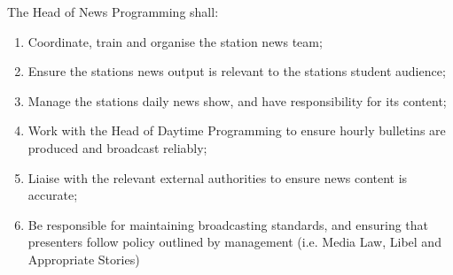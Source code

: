 \item The Head of News Programming shall:
\begin{enumerate}[label*=\arabic*.]
    \item Coordinate, train and organise the station news team;
    \item Ensure the stations news output is relevant to the stations student audience;
    \item Manage the stations daily news show, and have responsibility for its content;
    \item Work with the Head of Daytime Programming to ensure hourly bulletins are produced and broadcast reliably;
    \item Liaise with the relevant external authorities to ensure news content is accurate;
    \item Be responsible for maintaining broadcasting standards, and ensuring that presenters follow policy outlined by management (i.e. Media Law, Libel and Appropriate Stories)
\end{enumerate}
